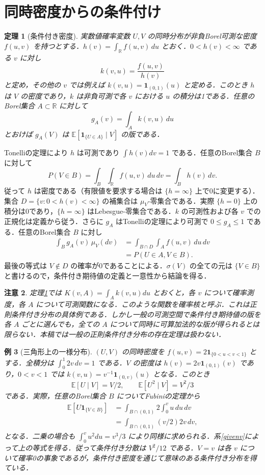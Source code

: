 \documentclass[a5paper,10pt,onecolumn]{jsarticle}
\makeatletter
\theoremstyle{mathnotetheorem}
\newtheorem{theorem}{定理}[section]
\newtheorem{example}[theorem]{例}
\newtheorem{remark}[theorem]{注意}
\renewcommand{\proofname}{証明}
\renewenvironment{proof}[1][\proofname]{%
  \par\pushQED{\qed}\normalfont\topsep4\p@\@plus2\p@\relax
  \trivlist\item[\hskip\labelsep\bfseries #1]\ignorespaces
}{\popQED\endtrivlist\@endpefalse}
\newcommand{\R}{\mathbb{R}}
\newcommand{\E}{\mathbb E}
\newcommand{\1}{\mathbf{1}}
\makeatother
\begin{document}
\section{同時密度からの条件付け}
\begin{theorem}[条件付き密度]\label{density}
実数値確率変数 $U,V$ の同時分布が非負Borel可測な密度 $f(u,v)$ を持つとする．$h(v)=\int_\R f(u,v)\,du$ とおく．$0<h(v)<\infty$ である $v$ に対し
\[
 k(v,u)=\frac{f(u,v)}{h(v)}
\]
と定め，その他の $v$ では例えば $k(v,u)=\1_{(0,1)}(u)$ と定める．このとき $h$ は $V$ の密度であり，$k$ は非負可測で各 $v$ における $u$ の積分は1である．任意のBorel集合 $A\subset\R$ に対して
\[
 g_A(v)=\int_A k(v,u)\,du
\]
とおけば $g_A(V)$ は $\E[\1_{\{U\in A\}}\mid V]$ の版である．
\end{theorem}
\begin{proof}
Tonelliの定理により $h$ は可測であり $\int h(v)dv=1$ である．任意のBorel集合 $B$ に対して
\[
 P(V\in B)=\int_B\int_\R f(u,v)\,du\,dv
 =\int_Bh(v)\,dv.
\]
従って $h$ は密度である（有限値を要求する場合は $\{h=\infty\}$ 上で0に変更する）．集合 $D=\{v:0<h(v)<\infty\}$ の補集合は $\mu_V$-零集合である．実際 $\{h=0\}$ 上の積分は0であり，$\{h=\infty\}$ はLebesgue-零集合である．$k$ の可測性および各 $v$ での正規化は定義から従う．さらに $g_A$ はTonelliの定理により可測で $0\le g_A\le1$ である．任意のBorel集合 $B$ に対し
\begin{align*}
 \int_B g_A(v)\,\mu_V(dv)
 &=\int_{B\cap D}\int_A f(u,v)\,du\,dv\\
 &=P(U\in A,V\in B).
\end{align*}
最後の等式は $V\notin D$ の確率が0であることによる．$\sigma(V)$ の全ての元は $\{V\in B\}$ と書けるので，条件付き期待値の定義と一意性から結論を得る．
\end{proof}
\begin{remark}
定理\ref{density}では $K(v,A)=\int_A k(v,u)du$ とおくと，各 $v$ について確率測度，各 $A$ について可測関数になる．このような関数を確率核と呼ぶ．これは正則条件付き分布の具体例である．しかし一般の可測空間で条件付き期待値の版を各 $A$ ごとに選んでも，全ての $A$ について同時に可算加法的な版が得られるとは限らない．本稿では一般の正則条件付き分布の存在定理は扱わない．
\end{remark}
\begin{example}[三角形上の一様分布]\label{triangle}
$(U,V)$ の同時密度を $f(u,v)=2\1_{\{0<u<v<1\}}$ とする．全積分は $\int_0^1 2v\,dv=1$ である．$V$ の密度は $h(v)=2v\1_{(0,1)}(v)$ であり，$0<v<1$ では $k(v,u)=v^{-1}\1_{(0,v)}(u)$ となる．このとき
\[
 \E[U\mid V]=V/2,
 \qquad \E[U^2\mid V]=V^2/3
\]
である．実際，任意のBorel集合 $B$ についてFubiniの定理から
\begin{align*}
 \E[U\1_{\{V\in B\}}]
 &=\int_{B\cap(0,1)}2\int_0^v u\,du\,dv\\
 &=\int_{B\cap(0,1)}(v/2)2v\,dv,
\end{align*}
となる．二乗の場合も $\int_0^v u^2du=v^3/3$ により同様に求められる．系\ref{givenv}によって上の等式を得る．従って条件付き分散は $V^2/12$ である．$V=v$ は各 $v$ について確率0の事象であるが，条件付き密度を通じて意味のある条件付き分布を得ている．
\end{example}
\end{document}
